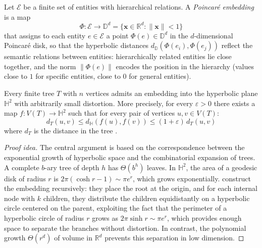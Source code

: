 \begin{definition}\label{def:embedding_poincare}
Let $\mathcal{E}$ be a finite set of entities with hierarchical relations. A \textit{Poincaré embedding} is a map
\begin{equation}
    \Phi: \mathcal{E} \to \mathbb{D}^d = \{\mathbf{x} \in \mathbb{R}^d : \|\mathbf{x}\| < 1\}
\end{equation}
that assigns to each entity $e \in \mathcal{E}$ a point $\Phi(e) \in \mathbb{D}^d$ in the $d$-dimensional Poincaré disk, so that the hyperbolic distances $d_{\mathbb{D}}(\Phi(e_i), \Phi(e_j))$ reflect the semantic relations between entities: hierarchically related entities lie close together, and the norm $\|\Phi(e)\|$ encodes the position in the hierarchy (values close to $1$ for specific entities, close to $0$ for general entities).
\end{definition}

\begin{theorem}\label{thm:embedding_arboles_hiperbolico}
Every finite tree $T$ with $n$ vertices admits an embedding into the hyperbolic plane $\mathbb{H}^2$ with arbitrarily small distortion. More precisely, for every $\varepsilon > 0$ there exists a map $f: V(T) \to \mathbb{H}^2$ such that for every pair of vertices $u, v \in V(T)$:
\begin{equation}
    d_T(u,v) \leq d_{\mathbb{H}}(f(u), f(v)) \leq (1+\varepsilon)\, d_T(u,v)
\end{equation}
where $d_T$ is the distance in the tree \citep{sarkar2011low}.
\end{theorem}

\begin{proof}[Proof idea]
The central argument is based on the correspondence between the exponential growth of hyperbolic space and the combinatorial expansion of trees. A complete $b$-ary tree of depth $h$ has $\Theta(b^h)$ leaves. In $\mathbb{H}^2$, the area of a geodesic disk of radius $r$ is $2\pi(\cosh r - 1) \sim \pi e^r$, which grows exponentially. \citet{sarkar2011low} construct the embedding recursively: they place the root at the origin, and for each internal node with $k$ children, they distribute the children equidistantly on a hyperbolic circle centered on the parent, exploiting the fact that the perimeter of a hyperbolic circle of radius $r$ grows as $2\pi \sinh r \sim \pi e^r$, which provides enough space to separate the branches without distortion. In contrast, the polynomial growth $\Theta(r^d)$ of volume in $\mathbb{R}^d$ prevents this separation in low dimension.
\end{proof}

